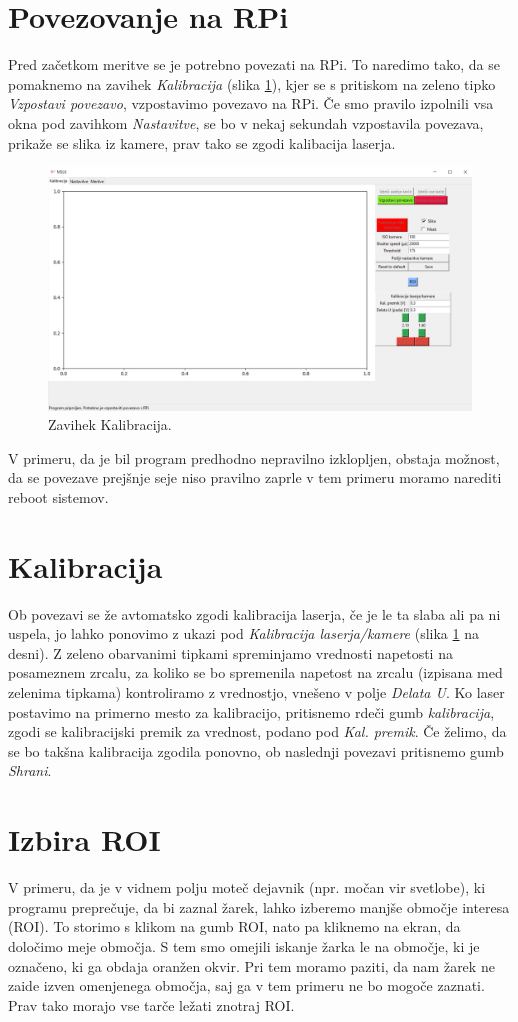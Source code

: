 \section{Povezovanje na RPi}
Pred začetkom meritve se je potrebno povezati na RPi. To naredimo tako, da se pomaknemo na zavihek \textit{Kalibracija} (slika \ref{fig:tab1}), kjer se s pritiskom na zeleno tipko \textit{Vzpostavi povezavo}, vzpostavimo povezavo na RPi.  Če smo pravilo izpolnili vsa okna pod zavihkom \textit{Nastavitve}, se bo v nekaj sekundah vzpostavila povezava, prikaže se slika iz kamere, prav tako se zgodi kalibacija laserja.
\begin{figure}[H]
    \centering
    \includegraphics[width=.7\linewidth,trim = 200 145 0 0,clip]{slike/tabkalibracija.png}
    \caption{Zavihek Kalibracija.}
    \label{fig:tab1}
\end{figure}
V primeru, da je bil program predhodno nepravilno izklopljen, obstaja možnost, da se povezave prejšnje seje niso pravilno zaprle v tem primeru moramo narediti reboot sistemov.

\section{Kalibracija}
Ob povezavi se že avtomatsko zgodi kalibracija laserja, če je le ta slaba ali pa ni uspela, jo lahko ponovimo z ukazi pod \textit{Kalibracija laserja/kamere} (slika \ref{fig:tab1} na desni). Z zeleno obarvanimi tipkami spreminjamo vrednosti napetosti na posameznem zrcalu, za koliko se bo spremenila napetost na zrcalu (izpisana med zelenima tipkama) kontroliramo z vrednostjo, vnešeno v polje \textit{Delata U}. Ko laser postavimo na primerno mesto za kalibracijo, pritisnemo rdeči gumb \textit{kalibracija}, zgodi se kalibracijski premik za vrednost, podano pod \textit{Kal. premik}. Če želimo, da se bo takšna kalibracija zgodila ponovno, ob naslednji povezavi pritisnemo gumb \textit{Shrani}.

\section{Izbira ROI}
V primeru, da je v vidnem polju moteč dejavnik (npr. močan vir svetlobe), ki programu preprečuje, da bi zaznal žarek, lahko izberemo manjše območje interesa (ROI). To storimo s klikom na gumb ROI, nato pa kliknemo na ekran, da določimo meje območja. S tem smo omejili iskanje žarka le na območje, ki je označeno, ki ga obdaja oranžen okvir. Pri tem moramo paziti, da nam žarek ne zaide izven omenjenega območja, saj ga v tem primeru ne bo mogoče zaznati. Prav tako morajo vse tarče ležati znotraj ROI.


